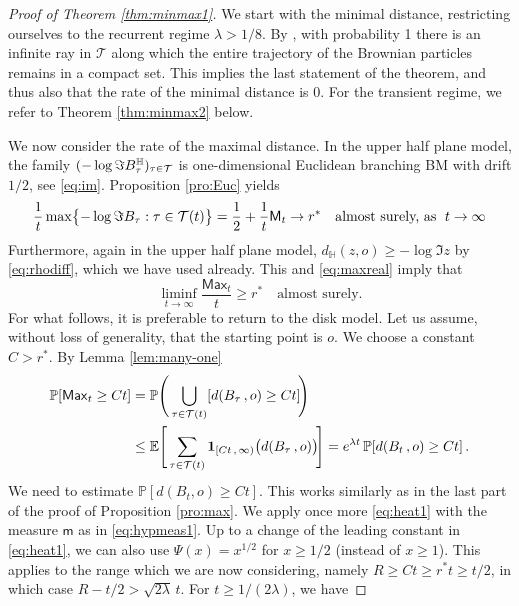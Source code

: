\documentclass[12pt]{amsart}
\newcommand\BB{\textit{\textbf{B}}}
\newcommand\E{\mathbb E}
\newcommand\HH{\mathbb H}
\newcommand\mm{\mathsf m}
\newcommand\Prob{\mathbb P}
\newcommand\ro{d}
\newcommand\T{\mathcal T}
\newcommand\uno{\mathbf 1}
\numberwithin{theorem}{section}
\theoremstyle{definition}
\begin{document}
\begin{proof}[Proof of Theorem \ref{thm:minmax1}]
We start with the minimal distance, restricting ourselves to the recurrent regime $\lambda > 1/8$.
By \cite[Cor. 3]{LS}, with probability 1 there is an infinite ray
in $\T$ along which the entire trajectory of the Brownian particles remains in a compact set. 
This implies
the last statement of the theorem, and thus also that the rate of the minimal distance is $0$. 
For the transient regime, we refer to Theorem \ref{thm:minmax2} below.

\medskip

We now consider the rate of the maximal distance.
In the upper half plane model, 
the family $(-\log \Im \BB_{\tau}^{\HH})_{\tau \in \T}$ is 
one-dimensional Euclidean branching BM with drift $1/2$, see \eqref{eq:im}. Proposition \ref{pro:Euc}
yields
\begin{equation}\label{eq:maxreal}
\frac{1}{t}\max\bigl\{ -\log \Im \BB_{\tau} : \tau \in \T(t) \bigr\} 
= \frac12 + \frac{1}{t}\mathsf{M}_t \to r^*
\quad \text{almost surely, as }\; t \to \infty 
\end{equation}
Furthermore, again in the upper half plane model,
$\ro_{\HH}(z,o) \ge -\log \Im z$ by \eqref{eq:rhodiff}, which we have used already. 
This and \eqref{eq:maxreal} imply that
$$
\liminf_{t \to \infty} \frac{\mathsf{Max}_t}{t}  \ge r^* \quad \text{almost surely.}
$$
For what follows, it is preferable to return to the disk model. 
Let us assume, without loss of generality, that the starting point  is $o$. 
We choose a constant $C > r^*$.
By Lemma \ref{lem:many-one}
$$ 
\begin{aligned}
\Prob[ \mathsf{Max}_t \ge Ct] 
&= \Prob\Biggl(\, \bigcup_{\tau \in \T(t)} [ \ro(\BB_{\tau}\,,o) \ge Ct] \!\Biggr)\\ 
&\le \E \Biggl[\, \sum_{\tau \in \T(t)} \uno_{[Ct\,,\,\infty)}\bigl( \ro(\BB_{\tau}\,,o) \bigr) 
  \!\Biggr]
  = e^{\lambda t} \,\Prob[ \ro(B_t\,,o) \ge Ct]\,. 
\end{aligned}
$$ 
We need to estimate $\Prob[ \ro(B_t,o) \ge Ct]$.  This works similarly as in the 
last part of the proof of Proposition \ref{pro:max}.  We apply once more 
\eqref{eq:heat1} with the measure $\mm$ as  in \eqref{eq:hypmeas1}. Up to a change of the leading 
constant in \eqref{eq:heat1}, we can also use $\Psi(x) = x^{1/2}$ for  
$x \ge 1/2$ (instead of $x \ge 1$).
This applies to the range which we are now considering, namely $R \ge Ct \ge r^*t \ge t/2$,
in which case $R - t/2 > \sqrt{2\lambda}\,t$. For $t \ge 1/(2\lambda)$, we have 

\end{proof}
\end{document}
